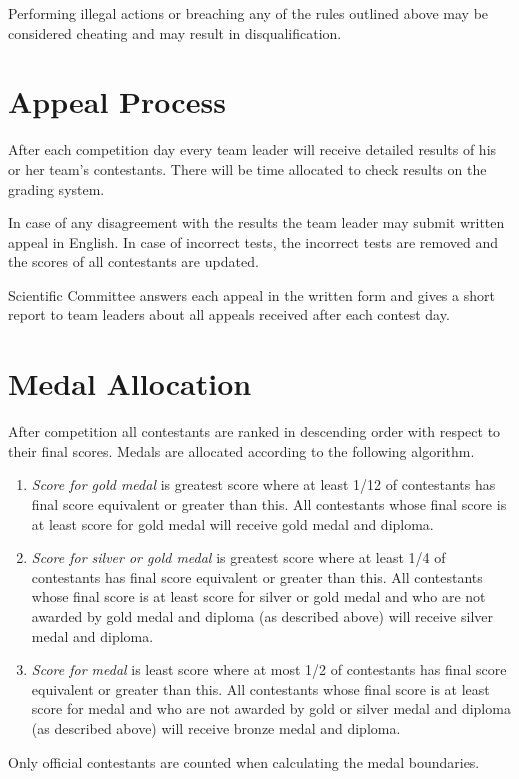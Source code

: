 \documentclass[a5paper,10pt,twoside]{book}
\begin{document}
Performing illegal actions or breaching any of the rules outlined above may be considered cheating and may result in disqualification.

\section{Appeal Process}

After each competition day every team leader will receive detailed results of
his or her team’s contestants. There will be time allocated to check results on
the grading system.

In case of any disagreement with the results the team leader may submit written
appeal in English. In case of incorrect tests, the incorrect tests are removed
and the scores of all contestants are updated.

Scientific Committee answers each appeal in the written form and gives a short
report to team leaders about all appeals received after each contest day.

\section{Medal Allocation}

After competition all contestants are ranked in descending order with respect to
their final scores. Medals are allocated according to the following algorithm.

\begin{enumerate}
    \item \emph{Score for gold medal} is greatest score where at least 1/12 of
    contestants has final score equivalent or greater than this. All contestants
    whose final score is at least score for gold medal will receive gold medal
    and diploma.
    \item \emph{Score for silver or gold medal} is greatest score where at least
    1/4 of contestants has final score equivalent or greater than this. All
    contestants whose final score is at least score for silver or gold medal and
    who are not awarded by gold medal and diploma (as described above) will
    receive silver medal and diploma.
    \item \emph{Score for medal} is least score where at most 1/2 of contestants
    has final score equivalent or greater than this. All contestants whose final
    score is at least score for medal and who are not awarded by gold or silver
    medal and diploma (as described above) will receive bronze medal and
    diploma.
\end{enumerate}

Only official contestants are counted when calculating the medal boundaries.
\end{document}

